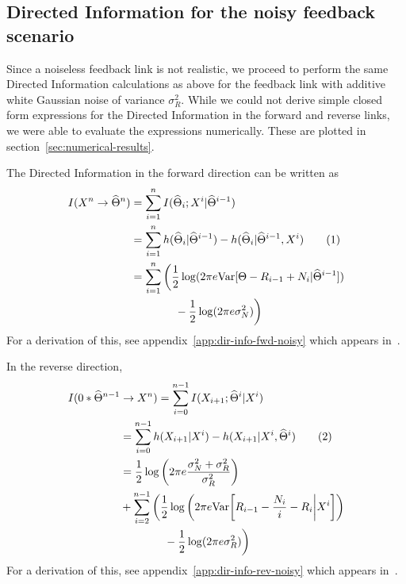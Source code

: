 \documentclass[letterpaper, 10pt, conference]{ieeeconf}
\newcommand\numberthis{\stepcounter{equation}\tag{\theequation}}
\begin{document}

\subsection{Directed Information for the noisy feedback scenario}

Since a noiseless feedback link is not realistic, we proceed to perform the same Directed Information calculations as above for the feedback link with additive white Gaussian noise of variance $\sigma_R^2$. While we could not derive simple closed form expressions for the Directed Information in the forward and reverse links, we were able to evaluate the expressions numerically. These are plotted in section~\ref{sec:numerical-results}.

The Directed Information in the forward direction can be written as
\begin{align*}
	I(X^n \rightarrow \widehat\Theta^n) &= \sum_{i=1}^n{I(\widehat\Theta_i ; X^i | \widehat\Theta^{i-1})} \\
										&= \sum_{i=1}^n{h(\widehat\Theta_i | \widehat\Theta^{i-1}) - h(\widehat\Theta_i | \widehat\Theta^{i-1}, X^i)} \numberthis \label{eq:dir-info-fwd-noisy} \\
										&= \sum_{i=1}^n \bigg( \frac{1}{2} \log(2 \pi e \text{Var}[\Theta - R_{i-1} + N_i | \widehat\Theta^{i-1}]) \\
										& \qquad \qquad - \frac{1}{2}\log(2 \pi e \sigma_N^2) \bigg)
\end{align*}
For a derivation of this, see appendix~\ref{app:dir-info-fwd-noisy} which appears in~\cite{Allerton15Online}.

In the reverse direction,
\begin{align*}
	I(0*\widehat\Theta^{n-1} & \rightarrow X^n) = \sum_{i=0}^{n-1}{I(X_{i+1}; \widehat\Theta^i | X^i)} \\
							 &= \sum_{i=0}^{n-1}{h(X_{i+1} | X^i) - h(X_{i+1} | X^i, \widehat\Theta^i)} \numberthis \label{eq:dir-info-rev-noisy} \\
							 &= \frac{1}{2} \log \bigg( 2 \pi e \frac{\sigma_N^2 + \sigma_R^2}{\sigma_R^2} \bigg) \\
							 & + \sum_{i=2}^{n-1} \bigg( \frac{1}{2} \log \bigg( 2 \pi e \text{Var} \bigg[ R_{i-1} - \frac{N_i}{i} - R_i \bigg| X^i \bigg] \bigg) \\
							 & \qquad \qquad - \frac{1}{2} \log( 2 \pi e \sigma_R^2 ) \bigg)
\end{align*}
For a derivation of this, see appendix~\ref{app:dir-info-rev-noisy} which appears in~\cite{Allerton15Online}.
\end{document}

